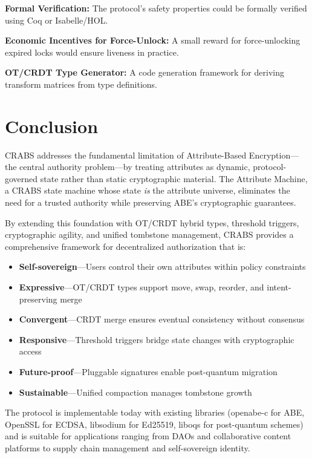 \documentclass[11pt,a4paper]{article}
\begin{document}
\textbf{Formal Verification:} The protocol's safety properties could be formally verified using Coq or Isabelle/HOL.

\textbf{Economic Incentives for Force-Unlock:} A small reward for force-unlocking expired locks would ensure liveness in practice.

\textbf{OT/CRDT Type Generator:} A code generation framework for deriving transform matrices from type definitions.

\section{Conclusion}

CRABS addresses the fundamental limitation of Attribute-Based Encryption---the central authority problem---by treating attributes as dynamic, protocol-governed state rather than static cryptographic material. The Attribute Machine, a CRABS state machine whose state \textit{is} the attribute universe, eliminates the need for a trusted authority while preserving ABE's cryptographic guarantees.

By extending this foundation with OT/CRDT hybrid types, threshold triggers, cryptographic agility, and unified tombstone management, CRABS provides a comprehensive framework for decentralized authorization that is:

\begin{itemize}[leftmargin=*]
    \item \textbf{Self-sovereign}---Users control their own attributes within policy constraints
    \item \textbf{Expressive}---OT/CRDT types support move, swap, reorder, and intent-preserving merge
    \item \textbf{Convergent}---CRDT merge ensures eventual consistency without consensus
    \item \textbf{Responsive}---Threshold triggers bridge state changes with cryptographic access
    \item \textbf{Future-proof}---Pluggable signatures enable post-quantum migration
    \item \textbf{Sustainable}---Unified compaction manages tombstone growth
\end{itemize}

The protocol is implementable today with existing libraries (openabe-c for ABE, OpenSSL for ECDSA, libsodium for Ed25519, liboqs for post-quantum schemes) and is suitable for applications ranging from DAOs and collaborative content platforms to supply chain management and self-sovereign identity.
\end{document}
